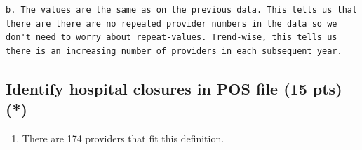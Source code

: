 \documentclass[
  letterpaper,
  DIV=11,
  numbers=noendperiod]{scrartcl}
\providecommand{\tightlist}{%
  \setlength{\itemsep}{0pt}\setlength{\parskip}{0pt}}\usepackage{longtable,booktabs,array}
\begin{document}
\begin{verbatim}
b. The values are the same as on the previous data. This tells us that there are there are no repeated provider numbers in the data so we don't need to worry about repeat-values. Trend-wise, this tells us there is an increasing number of providers in each subsequent year.
\end{verbatim}

\subsection{Identify hospital closures in POS file (15 pts)
(*)}\label{identify-hospital-closures-in-pos-file-15-pts}

\begin{enumerate}
\def\labelenumi{\arabic{enumi}.}
\tightlist
\item
  There are 174 providers that fit this definition.
\end{enumerate}
\end{document}
